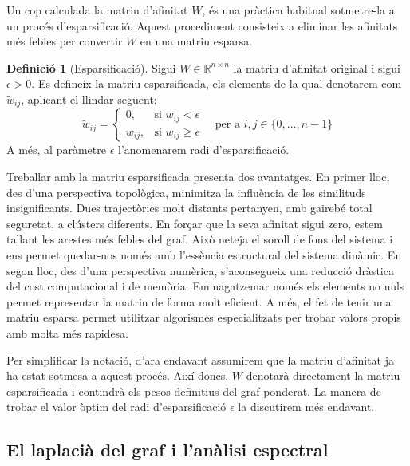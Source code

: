 \documentclass[12,twoside]{TFG-GM}
\theoremstyle{definition}
\newtheorem{definition}[theorem]{Definició}
\theoremstyle{remark}
\newcommand{\R}{\mathbb{R}}
\begin{document}
Un cop calculada la matriu d'afinitat $W$, és una pràctica habitual sotmetre-la a un procés d'esparsificació. Aquest procediment consisteix a eliminar les afinitats més febles per convertir $W$ en una matriu esparsa.

\begin{definition}[Esparsificació]
    \label{def:esparsificacio}
    Sigui $W \in \R^{n \times n}$ la matriu d'afinitat original i sigui $\epsilon > 0$. Es defineix la matriu esparsificada, els elements de la qual denotarem com $\tilde{w}_{ij}$, aplicant el llindar següent:
    \begin{equation}
        \tilde{w}_{ij} = 
        \begin{cases}
            0, & \text{si } w_{ij} < \epsilon \\
            w_{ij}, & \text{si } w_{ij} \geq \epsilon
        \end{cases}
        \quad \text{per a } i,j \in \{0, \dots, n-1\}
    \end{equation}
    A més, al paràmetre $\epsilon$ l'anomenarem radi d'esparsificació.
\end{definition}

Treballar amb la matriu esparsificada presenta dos avantatges. En primer lloc, des d'una perspectiva topològica, minimitza la influència de les similituds insignificants. Dues trajectòries molt distants pertanyen, amb gairebé total seguretat, a clústers diferents. En forçar que la seva afinitat sigui zero, estem tallant les arestes més febles del graf. Això neteja el soroll de fons del sistema i ens permet quedar-nos només amb l'essència estructural del sistema dinàmic. En segon lloc, des d'una perspectiva numèrica, s'aconsegueix una reducció dràstica del cost computacional i de memòria. Emmagatzemar només els elements no nuls permet representar la matriu de forma molt eficient. A més, el fet de tenir una matriu esparsa permet utilitzar algorismes especialitzats per trobar valors propis amb molta més rapidesa.

Per simplificar la notació, d'ara endavant assumirem que la matriu d'afinitat ja ha estat sotmesa a aquest procés. Així doncs, $W$ denotarà directament la matriu esparsificada i contindrà els pesos definitius del graf ponderat. La manera de trobar el valor òptim del radi d'esparsificació $\epsilon$ la discutirem més endavant.


\subsection{El laplacià del graf i l'anàlisi espectral} \label{seccio:espectral}
\end{document}
